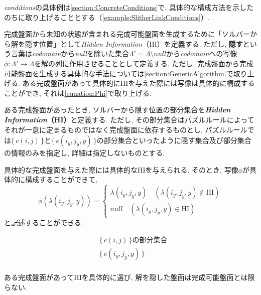 \textit{conditions}の具体例は\cref{section:ConcreteConditions}で, 具体的な構成方法を示したのちに取り上げることとする（\cref{example:SlitherLinkConditions}）.



完成盤面から未知の状態が含まれる完成可能盤面を生成するために「ソルバーから解を隠す位置」として\textit{Hidden Information}（HI）を定義する.
ただし, \textbf{隠す}という言葉は\textit{codomain}から\textit{null}を除いた集合$\Lambda'=\Lambda \setminus \textit{null}$から\textit{codomain}への写像$\phi\colon \Lambda' \longrightarrow \Lambda$を解の列に作用させることとして定義する. ただし, 完成盤面から完成可能盤面を生成する具体的な手法については\cref{section:GenericAlgorithm}で取り上げる. ある完成盤面があって具体的にHIを与えた際には写像は具体的に構成することができ, それは\cref{equation:Phi}で取り上げる.

\begin{definition}\label{definition:HiddenInformation}
  ある完成盤面があったとき, ソルバーから隠す位置の部分集合を\textbf{\textit{Hidden Information}（HI）}と定義する.
  ただし, その部分集合はパズルルールによってそれが一意に定まるものではなく完成盤面に依存するものとし, パズルルールでは$\{\,c(i,j)\,\}$と$\{\,e(i_y,j_y,y)\,\}$の部分集合といったように隠す集合及び部分集合の情報のみを指定し, 詳細は指定しないものとする.
\end{definition}

具体的な完成盤面を与えた際には具体的なHIを与えられる. そのとき, 写像$\phi$が具体的に構成することができて,
\begin{equation}\label{equation:Phi}
  \phi(\lambda(i_y,j_y,y))=
  \begin{cases}
    {\lambda(i_y,j_y,y) \quad (\lambda(i_y,j_y,y) \not\in \text{HI})} \\
    {\textit{null} \quad (\lambda(i_y,j_y,y) \in \text{HI})}
  \end{cases}
\end{equation}
と記述することができる.

\begin{example}[スリザーリンクのHI]\label{example:SlitherLinkHiddenInformation}
  \begin{align}
     & \{\,c(i,j)\,\}の部分集合  \\
     & \{\,e(i_y,j_y,y)\,\} \\
  \end{align}
\end{example}

\begin{remark}\label{remark:HI}
  ある完成盤面があってHIを具体的に選び, 解を隠した盤面は完成可能盤面とは限らない.
\end{remark}

